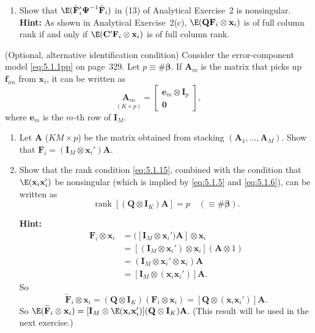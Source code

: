 \begin{problemset}
\begin{enumerate}[label=(\alph*)]
\item Show that $\E(\hat{\mathbf{F}}_i'\boldsymbol{\Psi}^{-1}\hat{\mathbf{F}}_i)$ in (13) of Analytical Exercise~2 is nonsingular.
  \textbf{Hint:} As shown in Analytical Exercise~2(c),
  $\E(\mathbf{Q}\mathbf{F}_i \otimes \mathbf{x}_i)$ is of full column rank
  if and only if $\E(\mathbf{C}'\mathbf{F}_i \otimes \mathbf{x}_i)$ is of full column rank.
\end{enumerate}

\exercise[6]
(Optional, alternative identification condition)\quad
Consider the error-component
model \eqref{eq:5.1.1pp} on page~329. Let $p \equiv \#\boldsymbol{\beta}$. If $\mathbf{A}_m$ is the matrix that picks up
$\mathbf{f}_{im}$ from $\mathbf{x}_i$, it can be written as
\[
  \underset{(K \times p)}{\mathbf{A}_m} = \begin{bmatrix} \mathbf{e}_m \otimes \mathbf{I}_p \\ \mathbf{0} \end{bmatrix},
\]
where $\mathbf{e}_m$ is the $m$-th row of $\mathbf{I}_M$.

\begin{enumerate}[label=(\alph*)]
\item Let $\mathbf{A}$ ($KM \times p$) be the matrix obtained from stacking
  $(\mathbf{A}_1, \ldots, \mathbf{A}_M)$. Show
  that $\mathbf{F}_i = (\mathbf{I}_M \otimes \mathbf{x}_i')\mathbf{A}$.

\item Show that the rank condition \eqref{eq:5.1.15}, combined with the condition that
  $\E(\mathbf{x}_i\mathbf{x}_i')$ be nonsingular (which is implied by \eqref{eq:5.1.5} and
  \eqref{eq:5.1.6}), can be
  written as
  \[
    \operatorname{rank}[(\mathbf{Q} \otimes \mathbf{I}_K)\mathbf{A}] = p
    \quad (\equiv \#\boldsymbol{\beta}).
  \]

  \textbf{Hint:}
  \begin{align*}
    \mathbf{F}_i \otimes \mathbf{x}_i
    &= ([\mathbf{I}_M \otimes \mathbf{x}_i')\mathbf{A}] \otimes \mathbf{x}_i \\
    &= [(\mathbf{I}_M \otimes \mathbf{x}_i') \otimes \mathbf{x}_i](\mathbf{A} \otimes 1) \\
    &= (\mathbf{I}_M \otimes \mathbf{x}_i' \otimes \mathbf{x}_i)\mathbf{A} \\
    &= [\mathbf{I}_M \otimes (\mathbf{x}_i\mathbf{x}_i')]\mathbf{A}.
  \end{align*}
  So
  \[
    \widetilde{\mathbf{F}}_i \otimes \mathbf{x}_i
    = (\mathbf{Q} \otimes \mathbf{I}_K)(\mathbf{F}_i \otimes \mathbf{x}_i)
    = [\mathbf{Q} \otimes (\mathbf{x}_i\mathbf{x}_i')]\mathbf{A}.
  \]
  So $\E(\widetilde{\mathbf{F}}_i \otimes \mathbf{x}_i)
  = [\mathbf{I}_M \otimes \E(\mathbf{x}_i\mathbf{x}_i')](\mathbf{Q} \otimes \mathbf{I}_K)\mathbf{A}$.
  (This result will be used in the next exercise.)
\end{enumerate}


\end{problemset}
